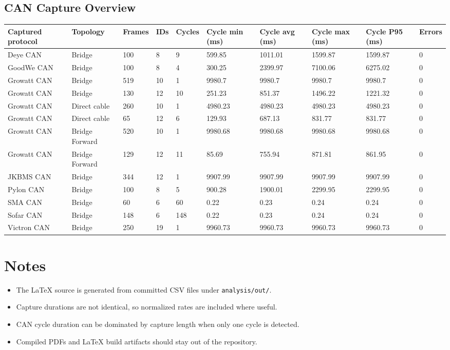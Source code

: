 \documentclass[11pt,a4paper]{article}
\begin{document}
\begin{landscape}
\subsection{CAN Capture Overview}
\begingroup
\scriptsize
\setlength{\tabcolsep}{3pt}
\setlength{\LTpre}{0.35em}
\setlength{\LTpost}{0.45em}
\begin{longtable}{@{}L{4.8cm}L{2.35cm}L{1.2cm}L{1.0cm}L{1.2cm}L{1.9cm}L{1.9cm}L{1.9cm}L{1.9cm}L{1.1cm}@{}}
\toprule
Captured protocol & Topology & Frames & IDs & Cycles & Cycle min (ms) & Cycle avg (ms) & Cycle max (ms) & Cycle P95 (ms) & Errors \\
\midrule
\endhead
Deye CAN & Bridge & 100 & 8 & 9 & 599.85 & 1011.01 & 1599.87 & 1599.87 & 0 \\
GoodWe CAN & Bridge & 100 & 8 & 4 & 300.25 & 2399.97 & 7100.06 & 6275.02 & 0 \\
Growatt CAN & Bridge & 519 & 10 & 1 & 9980.7 & 9980.7 & 9980.7 & 9980.7 & 0 \\
Growatt CAN & Bridge & 130 & 12 & 10 & 251.23 & 851.37 & 1496.22 & 1221.32 & 0 \\
Growatt CAN & Direct cable & 260 & 10 & 1 & 4980.23 & 4980.23 & 4980.23 & 4980.23 & 0 \\
Growatt CAN & Direct cable & 65 & 12 & 6 & 129.93 & 687.13 & 831.77 & 831.77 & 0 \\
Growatt CAN & Bridge Forward & 520 & 10 & 1 & 9980.68 & 9980.68 & 9980.68 & 9980.68 & 0 \\
Growatt CAN & Bridge Forward & 129 & 12 & 11 & 85.69 & 755.94 & 871.81 & 861.95 & 0 \\
JKBMS CAN & Bridge & 344 & 12 & 1 & 9907.99 & 9907.99 & 9907.99 & 9907.99 & 0 \\
Pylon CAN & Bridge & 100 & 8 & 5 & 900.28 & 1900.01 & 2299.95 & 2299.95 & 0 \\
SMA CAN & Bridge & 60 & 6 & 60 & 0.22 & 0.23 & 0.24 & 0.24 & 0 \\
Sofar CAN & Bridge & 148 & 6 & 148 & 0.22 & 0.23 & 0.24 & 0.24 & 0 \\
Victron CAN & Bridge & 250 & 19 & 1 & 9960.73 & 9960.73 & 9960.73 & 9960.73 & 0 \\
\bottomrule
\end{longtable}
\endgroup

\end{landscape}


\section*{Notes}

\begin{itemize}[leftmargin=*]
\item The LaTeX source is generated from committed CSV files under \texttt{analysis/out/}.
\item Capture durations are not identical, so normalized rates are included where useful.
\item CAN cycle duration can be dominated by capture length when only one cycle is detected.
\item Compiled PDFs and LaTeX build artifacts should stay out of the repository.
\end{itemize}
\end{document}
